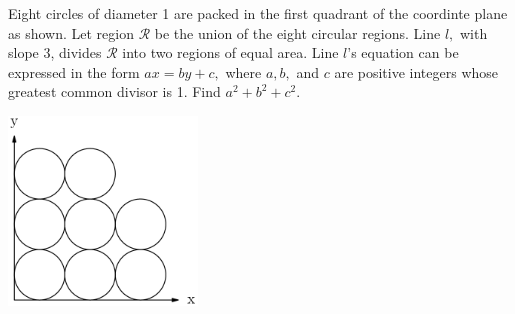 Eight circles of diameter 1 are packed in the first quadrant of the coordinte plane as shown.  Let region $\mathcal{R}$ be the union of the eight circular regions.  Line $l,$ with slope 3, divides $\mathcal{R}$ into two regions of equal area.  Line $l$'s equation can be expressed in the form $ax=by+c,$ where $a, b,$ and $c$ are positive integers whose greatest common divisor is 1.  Find $a^2+b^2+c^2.$

\begin{center}
\includegraphics[width = 50.400000000000006mm]{img/fig0.png}
\end{center}